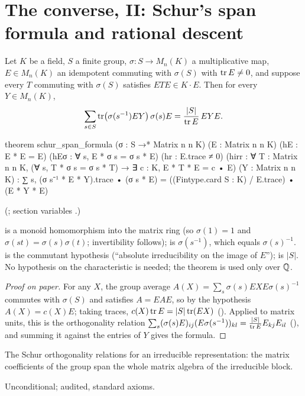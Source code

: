 \section{The converse, II: Schur's span formula and rational descent}\label{ch22:sec:schur}

\begin{theorem}\label{ch22:thm:schurspan}
Let $K$ be a field, $S$ a finite group, $\sigma:S\to M_n(K)$ a multiplicative map, $E\in M_n(K)$ an idempotent commuting with
$\sigma(S)$ with $\operatorname{tr} E\ne0$, and suppose every $T$ commuting with $\sigma(S)$ satisfies $ETE\in K\cdot E$.  Then for every
$Y\in M_n(K)$,
\begin{equation*}
  \sum_{s\in S}\operatorname{tr}\bigl(\sigma(s^{-1})EY\bigr)\,\sigma(s)E=\frac{|S|}{\operatorname{tr} E}\,EYE .
\end{equation*}
\end{theorem}
\begin{leancode}
theorem schur_span_formula (σ : S →* Matrix n n K) (E : Matrix n n K) (hE : E * E = E)
    (hEσ : ∀ s, E * σ s = σ s * E) (hr : E.trace ≠ 0)
    (hirr : ∀ T : Matrix n n K, (∀ s, T * σ s = σ s * T) → ∃ c : K, E * T * E = c • E)
    (Y : Matrix n n K) :
    ∑ s, (σ s⁻¹ * E * Y).trace • (σ s * E)
      = ((Fintype.card S : K) / E.trace) • (E * Y * E)
\end{leancode}
(; section variables
.)
\begin{dictionary}
 is a monoid homomorphism into the matrix ring (so $\sigma(1)=1$ and $\sigma(st)=\sigma(s)\sigma(t)$;
invertibility follows);  is $\sigma(s^{-1})$, which equals $\sigma(s)^{-1}$.   is the commutant
hypothesis (``absolute irreducibility on the image of $E$'');  is $|S|$.  No hypothesis on the characteristic is needed; the theorem is used only over ${\mathbb{Q}}$.
\end{dictionary}
\begin{proof}[Proof on paper]
For any $X$, the group average $A(X)=\sum_s\sigma(s)EXE\sigma(s)^{-1}$ commutes with $\sigma(S)$ and satisfies $A=EAE$, so
by the hypothesis $A(X)=c(X)E$; taking traces, $c(X)\operatorname{tr} E=|S|\operatorname{tr}(EX)$ ().  Applied to matrix
units, this is the orthogonality relation $\sum_s(\sigma(s)E)_{ij}(E\sigma(s^{-1}))_{kl}=\frac{|S|}{\operatorname{tr} E}E_{kj}E_{il}$
(), and summing it against the entries of $Y$ gives the formula.
\end{proof}
\begin{physics}The Schur orthogonality relations for an irreducible representation: the matrix coefficients of the group
span the whole matrix algebra of the irreducible block.\end{physics}
\begin{status}Unconditional; audited, standard axioms.\end{status}

